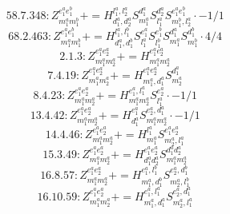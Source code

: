 \documentclass[letterpaper,10pt,fleqn,leqno,onecolumn]{article}
\begin{document}
\begin{equation} \;\;\;\;\;\;  58.7.348: Z^{e_{1}^{a}e_{1}^{b}}_{m_{1}^{a}m_{1}^{b}}+=H^{l_{1}^{a},l_{2}^{a}}_{d_{1}^{a},d_{2}^{a}}S^{d_{1}^{a}}_{m_{1}^{a}}S^{d_{2}^{a}}_{l_{1}^{a}}S^{e_{1}^{a}e_{1}^{b}}_{m_{1}^{b},l_{2}^{a}}\cdot -1/1 \end{equation}
\begin{equation} \;\;\;\;\;\;  68.2.463: Z^{e_{1}^{a}e_{1}^{b}}_{m_{1}^{a}m_{1}^{b}}+=H^{l_{1}^{a},l_{1}^{b}}_{d_{1}^{a},d_{1}^{b}}S^{e_{1}^{a}}_{l_{1}^{a}}S^{e_{1}^{b}}_{l_{1}^{b}}S^{d_{1}^{a}}_{m_{1}^{a}}S^{d_{1}^{b}}_{m_{1}^{b}}\cdot 4/4 \end{equation}
\begin{equation} \;\;\;\;\;\;  2.1.3: Z^{e_{1}^{a}e_{2}^{a}}_{m_{1}^{a}m_{2}^{a}}+=H^{e_{1}^{a}e_{2}^{a}}_{m_{1}^{a}m_{2}^{a}} \end{equation}
\begin{equation} \;\;\;\;\;\;  7.4.19: Z^{e_{1}^{a}e_{2}^{a}}_{m_{1}^{a}m_{2}^{a}}+=H^{e_{1}^{a}e_{2}^{a}}_{m_{1}^{a},d_{1}^{a}}S^{d_{1}^{a}}_{m_{2}^{a}} \end{equation}
\begin{equation} \;\;\;\;\;\;  8.4.23: Z^{e_{1}^{a}e_{2}^{a}}_{m_{1}^{a}m_{2}^{a}}+=H^{e_{1}^{a},l_{1}^{a}}_{m_{1}^{a}m_{2}^{a}}S^{e_{2}^{a}}_{l_{1}^{a}}\cdot -1/1 \end{equation}
\begin{equation} \;\;\;\;\;\;  13.4.42: Z^{e_{1}^{a}e_{2}^{a}}_{m_{1}^{a}m_{2}^{a}}+=H^{e_{1}^{a}}_{d_{1}^{a}}S^{e_{2}^{a},d_{1}^{a}}_{m_{1}^{a}m_{2}^{a}}\cdot -1/1 \end{equation}
\begin{equation} \;\;\;\;\;\;  14.4.46: Z^{e_{1}^{a}e_{2}^{a}}_{m_{1}^{a}m_{2}^{a}}+=H^{l_{1}^{a}}_{m_{1}^{a}}S^{e_{1}^{a}e_{2}^{a}}_{m_{2}^{a},l_{1}^{a}} \end{equation}
\begin{equation} \;\;\;\;\;\;  15.3.49: Z^{e_{1}^{a}e_{2}^{a}}_{m_{1}^{a}m_{2}^{a}}+=H^{e_{1}^{a}e_{2}^{a}}_{d_{1}^{a}d_{2}^{a}}S^{d_{1}^{a}d_{2}^{a}}_{m_{1}^{a}m_{2}^{a}} \end{equation}
\begin{equation} \;\;\;\;\;\;  16.8.57: Z^{e_{1}^{a}e_{2}^{a}}_{m_{1}^{a}m_{2}^{a}}+=H^{e_{1}^{a},l_{1}^{b}}_{m_{1}^{a},d_{1}^{b}}S^{e_{2}^{a},d_{1}^{b}}_{m_{2}^{a},l_{1}^{b}} \end{equation}
\begin{equation} \;\;\;\;\;\;  16.10.59: Z^{e_{1}^{a}e_{2}^{a}}_{m_{1}^{a}m_{2}^{a}}+=H^{e_{1}^{a},l_{1}^{a}}_{m_{1}^{a},d_{1}^{a}}S^{e_{2}^{a},d_{1}^{a}}_{m_{2}^{a},l_{1}^{a}} \end{equation}
\end{document}
